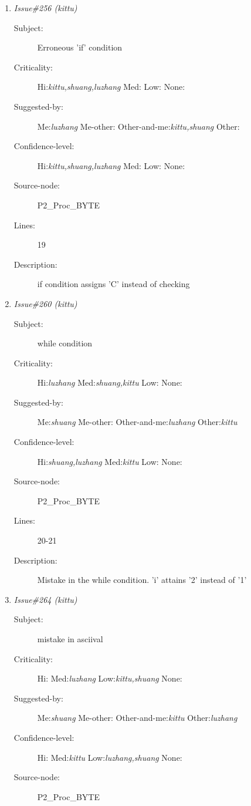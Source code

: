 \begin{enumerate}
\begin{description}
\item [Lines:] 19

\item [Description:] Function doesn't read the program name into
the object code
\end{description}
\item {\it Issue\#256 (kittu)}
\begin{description}
\item [Subject:] Erroneous 'if' condition
\item [Criticality:] Hi:{\it kittu,shuang,luzhang} Med:{\it } Low:{\it } None:{\it }
\item [Suggested-by:] Me:{\it luzhang} Me-other:{\it } Other-and-me:{\it kittu,shuang} Other:{\it }
\item [Confidence-level:] Hi:{\it kittu,shuang,luzhang} Med:{\it } Low:{\it } None:{\it }
\item [Source-node:] P2\_Proc\_BYTE

\item [Lines:] 19

\item [Description:] if condition assigns 'C' instead of checking
\end{description}
\item {\it Issue\#260 (kittu)}
\begin{description}
\item [Subject:] while condition
\item [Criticality:] Hi:{\it luzhang} Med:{\it shuang,kittu} Low:{\it } None:{\it }
\item [Suggested-by:] Me:{\it shuang} Me-other:{\it } Other-and-me:{\it luzhang} Other:{\it kittu}
\item [Confidence-level:] Hi:{\it shuang,luzhang} Med:{\it kittu} Low:{\it } None:{\it }
\item [Source-node:] P2\_Proc\_BYTE

\item [Lines:] 20-21

\item [Description:] Mistake in the while condition.  'i' attains
'2' instead of '1'
\end{description}
\item {\it Issue\#264 (kittu)}
\begin{description}
\item [Subject:] mistake in asciival
\item [Criticality:] Hi:{\it } Med:{\it luzhang} Low:{\it kittu,shuang} None:{\it }
\item [Suggested-by:] Me:{\it shuang} Me-other:{\it } Other-and-me:{\it kittu} Other:{\it luzhang}
\item [Confidence-level:] Hi:{\it } Med:{\it kittu} Low:{\it luzhang,shuang} None:{\it }
\item [Source-node:] P2\_Proc\_BYTE


\end{description}
\end{enumerate}
